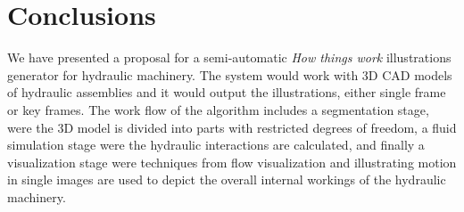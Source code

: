 \chapter{Conclusions}

We have presented a proposal for a semi-automatic \textit{How things work} illustrations generator for hydraulic machinery.
The system would work with 3D CAD models of hydraulic assemblies and it would output the illustrations, either single frame or key frames.
The work flow of the algorithm includes a segmentation stage, were the 3D model is divided into parts with restricted degrees of freedom, a fluid simulation stage were the hydraulic interactions are calculated, and finally a visualization stage were techniques from flow visualization and illustrating motion in single images are used to depict the overall internal workings of the hydraulic machinery.